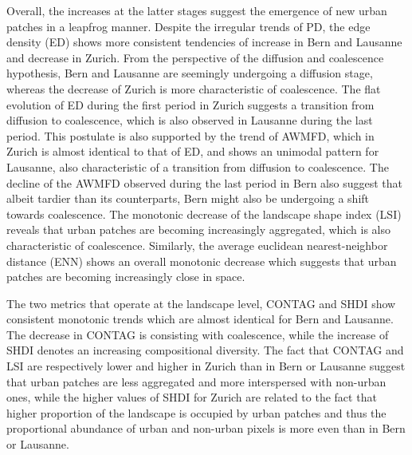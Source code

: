 \documentclass[10pt,letterpaper]{article}
\begin{document}
Overall, the increases at the latter stages suggest the emergence of new urban patches in a leapfrog manner.
Despite the irregular trends of PD, the edge density (ED) shows more consistent tendencies of increase in Bern and Lausanne and decrease in Zurich. From the perspective of the diffusion and coalescence hypothesis, Bern and Lausanne are seemingly undergoing a diffusion stage, whereas the decrease of Zurich is more characteristic of coalescence. %
The flat evolution of ED during the first period in Zurich suggests a transition from diffusion to coalescence, which is also observed in Lausanne during the last period.
This postulate is also supported by the trend of AWMFD, which in Zurich is almost identical to that of ED, and shows an unimodal pattern for Lausanne, also characteristic of a transition from diffusion to coalescence. The decline of the AWMFD observed during the last period in Bern also suggest that albeit tardier than its counterparts, Bern might also be undergoing a shift towards coalescence.
The monotonic decrease of the landscape shape index (LSI) reveals that urban patches are becoming increasingly aggregated, which is also characteristic of coalescence. Similarly, the average euclidean nearest-neighbor distance (ENN) shows an overall monotonic decrease which suggests that urban patches are becoming increasingly close in space. %

The two metrics that operate at the landscape level, CONTAG and SHDI show consistent monotonic trends which are almost identical for Bern and Lausanne. The decrease in CONTAG is consisting with coalescence, %
while the increase of SHDI denotes an increasing compositional diversity. %
The fact that CONTAG and LSI are respectively lower and higher in Zurich than in Bern or Lausanne suggest that urban patches are less aggregated and more interspersed with non-urban ones, while the higher values of SHDI for Zurich are related to the fact that higher proportion of the landscape is occupied by urban patches and thus the proportional abundance of urban and non-urban pixels is more even than in Bern or Lausanne.
\end{document}
